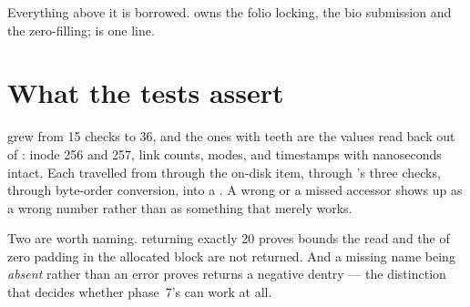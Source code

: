 Everything above it is borrowed.  owns the folio
locking, the bio submission and the zero-filling; 
is one line.


\section{What the tests assert}

 grew from 15 checks to 36, and the ones with teeth are the
values read back out of : inode 256 and 257, link counts, modes,
and timestamps with nanoseconds intact. Each travelled from
 through the on-disk item, through
's three checks, through byte-order conversion, into a
. A wrong  or a missed accessor shows up as
a wrong number rather than as something that merely works.

Two are worth naming.  returning exactly 20 proves 
bounds the read and the  of zero padding in the allocated block are
not returned. And a missing name being \emph{absent} rather than an error proves
 returns a negative dentry --- the distinction that decides
whether phase~7's  can work at all.
